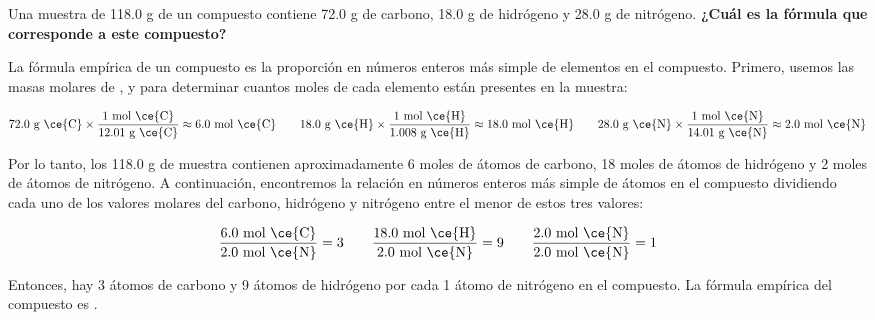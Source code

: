 Una muestra de 118.0 g de un compuesto contiene 72.0 g de carbono, 18.0 g de hidrógeno y 28.0 g de nitrógeno.
\textbf{¿Cuál es la fórmula que corresponde a este compuesto?}

\begin{oneparchoices}

    \choice {}
    \choice {}
    \CorrectChoice {}
    \choice {}
\end{oneparchoices}

\begin{solutionbox}{7.5cm}
    La fórmula empírica de un compuesto es la proporción en números enteros más simple de elementos en el compuesto.
    Primero, usemos las masas molares de ,  y  para determinar cuantos moles de cada elemento están presentes en la muestra:

    \[ 72.0 \text{ g \ce{C}} \times \frac{1 \text{ mol \ce{C}}}{12.01 \text{ g \ce{C}}} \approx 6.0 \text{ mol \ce{C}}  \qquad 18.0 \text{ g \ce{H}} \times \frac{1 \text{ mol \ce{H}}}{1.008 \text{ g \ce{H}}} \approx 18.0 \text{ mol \ce{H}}  \qquad  28.0 \text{ g \ce{N}} \times \frac{1 \text{ mol \ce{N}}}{14.01 \text{ g \ce{N}}} \approx 2.0 \text{ mol \ce{N}} \]

    Por lo tanto, los 118.0 g de muestra contienen aproximadamente 6 moles de átomos de carbono, 18 moles de átomos de hidrógeno y 2 moles de átomos de nitrógeno.
    A continuación, encontremos la relación en números enteros más simple de átomos en el compuesto dividiendo cada uno de los valores molares del carbono, hidrógeno y nitrógeno entre el menor de estos tres valores:

    \[ \frac{6.0 \text{ mol \ce{C}}}{2.0 \text{ mol \ce{N}}} = 3 \qquad \frac{18.0 \text{ mol \ce{H}}}{2.0 \text{ mol \ce{N}}} = 9 \qquad \frac{2.0 \text{ mol \ce{N}}}{2.0 \text{ mol \ce{N}}} = 1 \]

    Entonces, hay 3 átomos de carbono y 9 átomos de hidrógeno por cada 1 átomo de nitrógeno en el compuesto.
    La fórmula empírica del compuesto es .
\end{solutionbox}